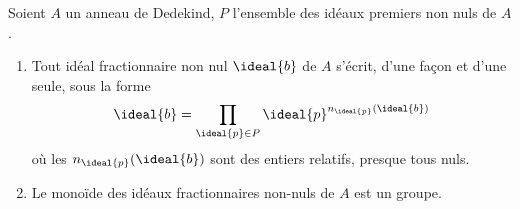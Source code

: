 \documentclass[11pt, useosf,
  title in boldface,
  theorem in new line,
  theorem numbering = section,
  number theorems separately,
]{simplivre}
\begin{document}
    \begin{theorem}\label{thm:propriétés d'anneaux de Dedekind}
        Soient \( A \) un anneau de Dedekind, \( P \) l'ensemble des idéaux premiers non nuls de \( A \).
\pagebreak
        \begin{enumerate}
            \item \label{thm:propriétés d'anneaux de Dedekind;item1} Tout idéal fractionnaire non nul \( \ideal{b} \) de \( A \) s'écrit, d'une façon et d'une seule, sous la forme
            \begin{equation}\label{eq:factorisation d'un idéal fractionnaire}
                \ideal{b} = \prod_{\ideal{p} \in P} \ideal{p}^{n_{\ideal{p}}(\ideal{b})}
            \end{equation}
            où les \( n_{\ideal{p}}(\ideal{b}) \) sont des entiers relatifs, presque tous nuls.
            \item \label{thm:propriétés d'anneaux de Dedekind;item2} Le monoïde des idéaux fractionnaires non-nuls de \( A \) est un groupe.
        \end{enumerate}
    \end{theorem}
\end{document}
